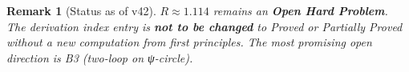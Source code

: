 \documentclass[11pt,a4paper]{article}
\newtheorem{remark}{Remark}
\begin{document}
\begin{remark}[Status as of v42]
  $R \approx 1.114$ remains an \textbf{Open Hard Problem}.
  The derivation index entry is \textbf{not to be changed} to Proved
  or Partially Proved without a new computation from first principles.
  The most promising open direction is B3 (two-loop on ψ-circle).
\end{remark}
\end{document}

